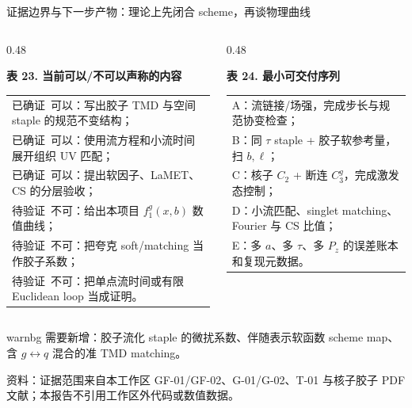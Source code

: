 \documentclass[UTF8,aspectratio=169,11pt]{ctexbeamer}
\newcommand{\source}[1]{%
  \par\vspace{-0.08em}%
  \noindent\parbox[t]{0.97\linewidth}{\raggedright\scriptsize\color{muted}资料：#1}\par}
\newcommand{\verified}{\textcolor{evidence}{已确证}}
\newcommand{\unverified}{\textcolor{warning}{待验证}}
\begin{document}
\begin{frame}[t]{证据边界与下一步产物：理论上先闭合 scheme，再谈物理曲线}
  \begin{columns}[T,totalwidth=\textwidth]
    \begin{column}{0.48\textwidth}
      \begin{center}
      \textbf{表 23. 当前可以/不可以声称的内容}
      \vspace{0.12em}
      {\scriptsize\begin{tabular}{@{}p{\linewidth}@{}}
        \toprule
        \verified\ 可以：写出胶子 TMD 与空间 staple 的规范不变结构；\\
        \verified\ 可以：使用流方程和小流时间展开组织 UV 匹配；\\
        \verified\ 可以：提出软因子、LaMET、CS 的分层验收；\\
        \unverified\ 不可：给出本项目 $f_1^g(x,b)$ 数值曲线；\\
        \unverified\ 不可：把夸克 soft/matching 当作胶子系数；\\
        \unverified\ 不可：把单点流时间或有限 Euclidean loop 当成证明。\\
        \bottomrule
      \end{tabular}}
      \end{center}
    \end{column}
    \begin{column}{0.48\textwidth}
      \begin{center}
      \textbf{表 24. 最小可交付序列}
      \vspace{0.12em}
      {\scriptsize\begin{tabular}{@{}p{\linewidth}@{}}
        \toprule
        A：流链接/场强，完成步长与规范协变检查；\\
        B：同 $\tau$ staple + 胶子软参考量，扫 $b,\ell$；\\
        C：核子 $C_2$ + 断连 $C_3^g$，完成激发态控制；\\
        D：小流匹配、singlet matching、Fourier 与 CS 比值；\\
        E：多 $a$、多 $\tau$、多 $P_z$ 的误差账本和复现元数据。\\
        \bottomrule
      \end{tabular}}
      \end{center}
    \end{column}
  \end{columns}
  \vfill
  \begin{beamercolorbox}[wd=0.96\textwidth,sep=0.55em,rounded=true]{warnbg}
    需要新增：胶子流化 staple 的微扰系数、伴随表示软函数 scheme map、含 $g\leftrightarrow q$ 混合的准 TMD matching。
  \end{beamercolorbox}
  \source{证据范围来自本工作区 GF-01/GF-02、G-01/G-02、T-01 与核子胶子 PDF 文献；本报告不引用工作区外代码或数值数据。}
\end{frame}
\end{document}
